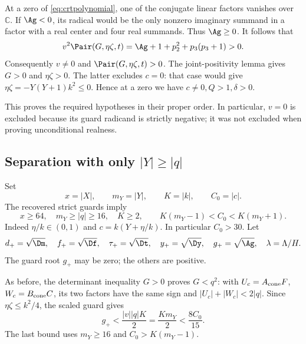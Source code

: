 At a zero of \eqref{eq:crtpolynomial}, one of the conjugate linear
factors vanishes over \(\mathbb C\). If \(\Ag<0\), its radical
would be the only nonzero imaginary summand in a factor with a real
center and four real summands. Thus \(\Ag\ge0\). It follows that
\begin{equation}
v^2\Pair(G,\eta\zeta,t)
=\Ag+1+p_2^2+p_3(p_3+1)>0.
\label{eq:crtguardrecover}
\end{equation}
Consequently \(v\ne0\) and \(\Pair(G,\eta\zeta,t)>0\). The
joint-positivity lemma gives \(G>0\) and \(\eta\zeta>0\).
The latter excludes \(c=0\): that case would give
\(\eta\zeta=-Y(Y+1)k^2\le0\). Hence at a zero we have
\(c\ne0,Q>1,\delta>0\).

This proves the required hypotheses in their proper order. In
particular, \(v=0\) is excluded because its guard radicand is strictly
negative; it was not excluded when proving unconditional realness.

\subsection{Separation with only \texorpdfstring{$|Y|\ge|q|$}{|Y|>=|q|}}

Set
\[
x=|X|,\qquad m_Y=|Y|,\qquad K=|k|,\qquad C_0=|c|.
\]
The recovered strict guards imply
\begin{equation}
x\ge64,\quad m_Y\ge|q|\ge16,\quad K\ge2,\qquad
K(m_Y-1)<C_0<K(m_Y+1).
\label{eq:crtweakbounds}
\end{equation}
Indeed \(\eta/k\in(0,1)\) and \(c=k(Y+\eta/k)\).
In particular \(C_0>30\). Let
\[
d_+=\sqrt{\Dm},\quad f_+=\sqrt{\Df},\quad
\tau_+=\sqrt{\Dt},\quad y_+=\sqrt{\Dy},\quad
g_+=\sqrt{\Ag},\quad \lambda=\Lambda/H.
\]
The guard root \(g_+\) may be zero; the others are positive.

As before, the determinant inequality \(G>0\) proves \(G<q^2\):
with \(U_c=A_{\rm cone}F\), \(W_c=B_{\rm cone}C\), its two factors
have the same sign and \(|U_c|+|W_c|<2|q|\).
Since \(\eta\zeta\le k^2/4\), the scaled guard gives
\begin{equation}
g_+<\frac{|v||q|K}{2}
=\frac{Km_Y}{2}<\frac{8C_0}{15}.
\label{eq:crtguardbound}
\end{equation}
The last bound uses \(m_Y\ge16\) and
\(C_0>K(m_Y-1)\).

